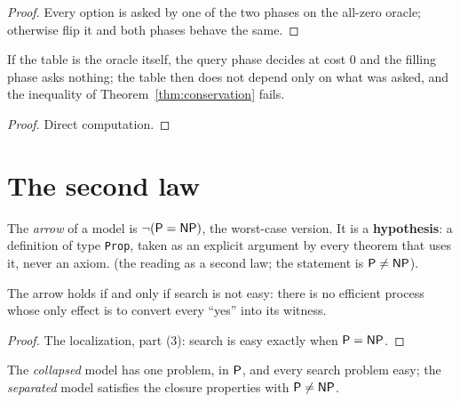 \begin{proof}
  \leanok
  Every option is asked by one of the two phases on the all-zero oracle; otherwise flip it and both
  phases behave the same.
\end{proof}

\begin{proposition}
  \label{prop:free-table}
  \leanok
  If the table is the oracle itself, the query phase decides at cost $0$ and the filling phase asks
  nothing; the table then does not depend only on what was asked, and the inequality of
  Theorem~\ref{thm:conservation} fails.
  \own{}
\end{proposition}

\begin{proof}
  \leanok
  Direct computation.
\end{proof}

\section{The second law}

\begin{definition}
  \label{def:arrow}
  \leanok
  The \emph{arrow} of a model is $\neg(\mathsf{P} = \mathsf{NP})$, the worst-case version. It is a
  \textbf{hypothesis}: a definition of type \texttt{Prop}, taken as an explicit argument by every
  theorem that uses it, never an axiom.
  \own{} (the reading as a second law; the statement is $\mathsf{P} \neq \mathsf{NP}$).
\end{definition}

\begin{theorem}
  \label{thm:kelvin}
  \leanok
  The arrow holds if and only if search is not easy: there is no efficient process whose only
  effect is to convert every ``yes'' into its witness.
  \own{}
\end{theorem}

\begin{proof}
  \leanok
  The localization, part (3): search is easy exactly when $\mathsf{P} = \mathsf{NP}$.
\end{proof}

\begin{definition}
  \label{def:two-models}
  \leanok
  The \emph{collapsed} model has one problem, in $\mathsf{P}$, and every search problem easy; the
  \emph{separated} model satisfies the closure properties with $\mathsf{P} \neq \mathsf{NP}$.
  \own{}
\end{definition}

